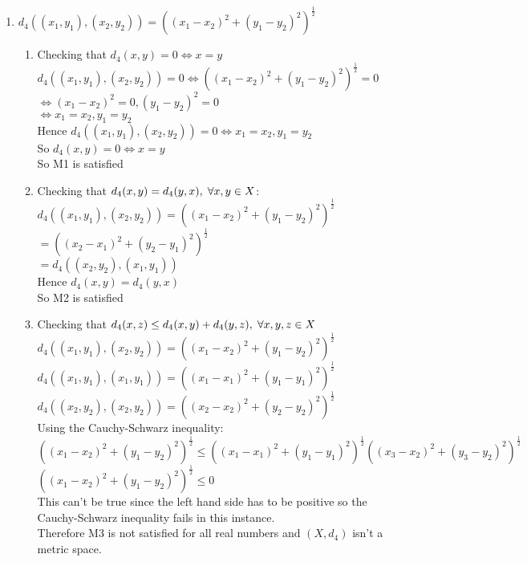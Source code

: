 \documentclass[,oneside]{article}
\numberwithin{equation}{section}
\begin{document}
\begin{enumerate}[label=(\roman*)]
     \item $d_4((x_1,y_1),(x_2,y_2))=((x_1-x_2)^2+(y_1-y_2)^2)^\frac{1}{2}$\\
       \begin{enumerate}[label=\alph*)]
       \item Checking that $d_4(x,y)=0\Leftrightarrow x=y$\\
       $d_4((x_1,y_1),(x_2,y_2))=0\Leftrightarrow ((x_1-x_2)^2+(y_1-y_2)^2)^\frac{1}{2}=0$\\
       $\Leftrightarrow (x_1-x_2)^2=0, (y_1-y_2)^2=0$\\
       $\Leftrightarrow x_1=x_2, y_1=y_2$\\
        Hence $d_4((x_1,y_1),(x_2,y_2))=0\Leftrightarrow x_1=x_2, y_1=y_2$\\
        So $d_4(x,y)=0\Leftrightarrow x=y$\\
        So M1 is satisfied\\
        \item Checking that $d_4(x,y)=d_4(y,x),\hspace{0.1cm} \forall x,y \in X$:\\
        $d_4((x_1,y_1),(x_2,y_2))=((x_1-x_2)^2+(y_1-y_2)^2)^\frac{1}{2}$\\
        $=((x_2-x_1)^2+(y_2-y_1)^2)^\frac{1}{2}$\\
        $=d_4((x_2,y_2),(x_1,y_1))$
        \\Hence $d_4(x,y)=d_4(y,x)$\\
        So M2 is satisfied\\ 
        \item Checking that $d_4(x,z) \leq d_4(x,y) + d_4(y,z), \hspace{0.1cm} \forall x,y,z \in X$\\
        $d_4((x_1,y_1),(x_2,y_2))=((x_1-x_2)^2+(y_1-y_2)^2)^\frac{1}{2}$\\
        $d_4((x_1,y_1),(x_1,y_1))=((x_1-x_1)^2+(y_1-y_1)^2)^\frac{1}{2}$\\
        $d_4((x_2,y_2),(x_2,y_2))=((x_2-x_2)^2+(y_2-y_2)^2)^\frac{1}{2}$\\
        Using the Cauchy-Schwarz inequality:\\
        $((x_1-x_2)^2+(y_1-y_2)^2)^\frac{1}{2} \leq ((x_1-x_1)^2+(y_1-y_1)^2)^\frac{1}{2}((x_3-x_2)^2+(y_3-y_2)^2)^\frac{1}{2}$\\
        $((x_1-x_2)^2+(y_1-y_2)^2)^\frac{1}{2} \leq 0$\\
        This can't be true since the left hand side has to be positive so the Cauchy-Schwarz inequality fails in this instance.\\
        Therefore M3 is not satisfied for all real numbers and $(X, d_4)$ isn't a metric space.
        
    \end{enumerate}
   \end{enumerate}
   
\end{document}
